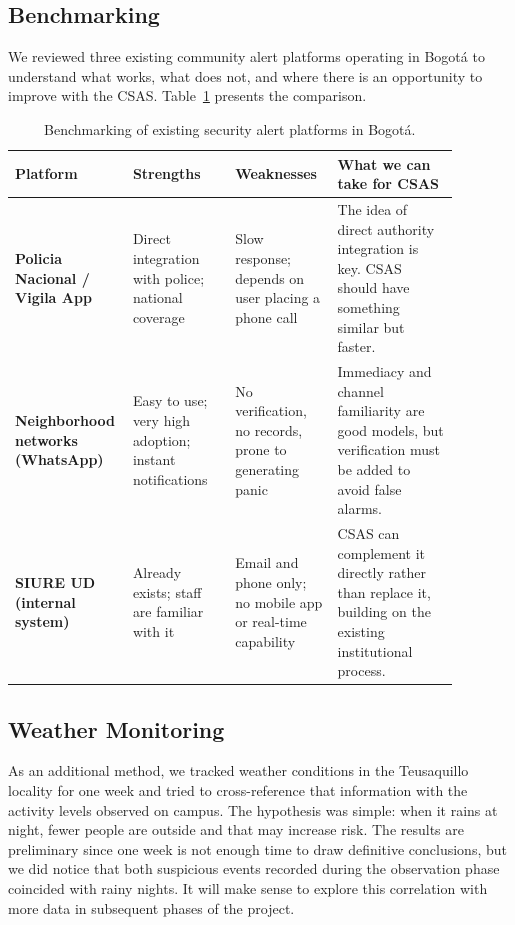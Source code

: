 \documentclass[12pt, onecolumn]{IEEEtran}
\begin{document}
\subsection{Benchmarking}

We reviewed three existing community alert platforms operating in
Bogot\'{a} to understand what works, what does not, and where there is
an opportunity to improve with the CSAS. Table~\ref{tab:bench} presents
the comparison.

\begin{table}[h]
\centering
\caption{Benchmarking of existing security alert platforms in Bogot\'{a}.}
\label{tab:bench}
\renewcommand{\arraystretch}{1.3}
\begin{tabular}{>{\bfseries\small}p{0.18\linewidth}
                >{\small}p{0.22\linewidth}
                >{\small}p{0.22\linewidth}
                >{\small}p{0.26\linewidth}}
\toprule
\textbf{Platform} & \textbf{Strengths} & \textbf{Weaknesses} &
\textbf{What we can take for CSAS} \\
\midrule
Policia Nacional / Vigila App
  & Direct integration with police; national coverage
  & Slow response; depends on user placing a phone call
  & The idea of direct authority integration is key. CSAS should have
    something similar but faster. \\
\rowcolor{rowgray}
Neighborhood networks (WhatsApp)
  & Easy to use; very high adoption; instant notifications
  & No verification, no records, prone to generating panic
  & Immediacy and channel familiarity are good models, but verification
    must be added to avoid false alarms. \\
SIURE UD (internal system)
  & Already exists; staff are familiar with it
  & Email and phone only; no mobile app or real-time capability
  & CSAS can complement it directly rather than replace it, building
    on the existing institutional process. \\
\bottomrule
\end{tabular}
\end{table}

\subsection{Weather Monitoring}

As an additional method, we tracked weather conditions in the Teusaquillo
locality for one week and tried to cross-reference that information with
the activity levels observed on campus. The hypothesis was simple: when
it rains at night, fewer people are outside and that may increase risk.
The results are preliminary since one week is not enough time to draw
definitive conclusions, but we did notice that both suspicious events
recorded during the observation phase coincided with rainy nights. It
will make sense to explore this correlation with more data in subsequent
phases of the project.
\end{document}
